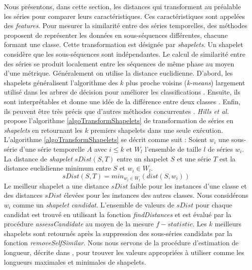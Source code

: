 Nous pr\'esentons, dans cette section,  les distances qui transforment au pr\'ealable les s\'eries pour comparer leurs caract\'eristiques. Ces caract\'eristiques sont appel\'ees des { \em features}. 
\newline
Pour mesurer la similarit\'e entre des s\'eries temporelles, des m\'ethodes proposent de repr\'esenter les donn\'ees en sous-s\'equences diff\'erentes, chacune formant une classe. Cette transformation est d\'esign\'ee par {\em shapelets}. Un shapelet consid\`ere que les sous-s\'equences sont ind\'ependantes. 
Le calcul de similarit\'e entre des s\'eries se produit localement entre les s\'equences de m\^eme phase au moyen d'une m\'etrique. G\'en\'eralement on utilise la distance euclidienne. 
D'abord, les shapelets g\'en\'eralisent l'algorithme des $k$ plus proche voisins ({\em k-means}) largement utilis\'e dans les arbres de d\'ecision pour am\'eliorer les classifications \cite{wang2013experimental}. Ensuite, ils sont interpr\'etables et donne une id\'ee de la diff\'erence entre deux classes \cite{ye2011time}. Enfin, ils peuvent \^etre tr\`es  pr\'ecis que d'autres m\'ethodes concurrentes \cite{mueen2011logical, ye2011time}.
\newline 
{\em Hills et al.} \cite{hills2014classificationShapelets} propose l'algorithme \ref{algoTransformShapelets} de transformation de s\'eries  en {\em shapelets} en retournant les $k$ premiers shapelets dans une seule ex\'ecution.
L'algorithme \ref{algoTransformShapelets} se d\'ecrit comme suit :
Soient $w_i$ une sous-s\'erie d'une s\'erie temporelle $A$ avec $i \le k$ et $W_l$ l'ensemble de taille $l$ de s\'eries $w_i$.
La distance de {\em shapelet}  $sDist(S, T)$ entre un shapelet $S$ et une s\'erie $T$ est la distance euclidienne minimum entre $S$ et $w_i \in W_l$.
$$
sDist(S, T) = min_{w_i \in W_l} (dist(S, w_i))
$$
Le meilleur shapelet a une distance $sDist$ faible pour les instances d'une classe et des distances $sDist$ \'elev\'ees pour les instances des autres classes.
\newline
Nous consid\'erons $w_i$ comme un {\em shapelet candidat}. L'ensemble de valeurs de $sDist$ pour chaque candidat est trouv\'e en utilisant la fonction {\em findDistances} et est \'evalu\'e par la proc\'edure {\em assessCandidate} au moyen de la mesure $f-statistic$. 
Les $k$ meilleurs shapelets sont retourn\'es apr\`es la suppression des sous-s\'eries candidats par la fonction {\em removeSelfSimilar}.
Nous nous servons de la proc\'edure d'estimation de longueur, d\'ecrite dans \cite{lines2012shapelet}, pour trouver les valeurs appropri\'ees \`a utiliser comme les longueurs maximales et minimales de shapelets. 
